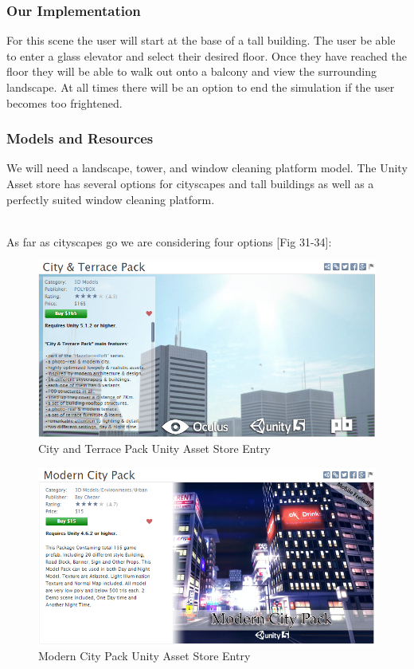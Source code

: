 \documentclass[a4paper,10pt]{article}
\begin{document}
\subsubsection{Our Implementation}
For this scene the user will start at the base of a tall building. The user be able to enter a glass elevator and select their desired floor. Once they have reached the floor they will be able to walk out onto a balcony and view the surrounding landscape. At all times there will be an option to end the simulation if the user becomes too frightened.

\subsubsection{Models and Resources}
We will need a landscape, tower, and window cleaning platform model. The Unity Asset store has several options for cityscapes and tall buildings as well as a perfectly suited window cleaning platform.
\par~\\ 
As far as cityscapes go we are considering four options [Fig 31-34]:
\begin{figure}[H] %
	\centerline {\includegraphics[scale = 0.50]{cityAndTerracePack.png}}
	\caption{City and Terrace Pack Unity Asset Store Entry}
	\label{fig:cityAndTerracePack}
\end{figure}
\begin{figure}[H] %
	\centerline {\includegraphics[scale = 0.50]{modernCityPack.png}}
	\caption{Modern City Pack Unity Asset Store Entry}
	\label{fig:modernCityPack}
\end{figure}
\end{document}
